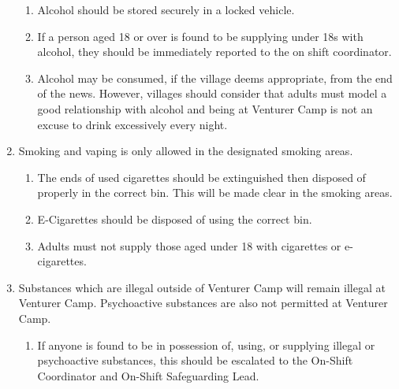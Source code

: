 \documentclass[a4paper, 11pt]{report}
\def\enumMarginIndentOne{4em}
\begin{document}
\begin{enumerate}
\begin{enumerate}[leftmargin=\enumMarginIndentOne]
            \item Alcohol should be stored securely in a locked vehicle.
            \item If a person aged 18 or over is found to be supplying under 18s with alcohol, they should be immediately reported to the on shift coordinator.
            \item Alcohol may be consumed, if the village deems appropriate, from the end of the news. However, villages should consider that adults must model a good relationship with alcohol and being at Venturer Camp is not an excuse to drink excessively every night.
        \end{enumerate}
        \item Smoking and vaping is only allowed in the designated smoking areas.
        \begin{enumerate}[leftmargin=\enumMarginIndentOne]
            \item The ends of used cigarettes should be extinguished then disposed of properly in the correct bin. This will be made clear in the smoking areas.
            \item E-Cigarettes should be disposed of using the correct bin. 
            \item Adults must not supply those aged under 18 with cigarettes or e-cigarettes.
        \end{enumerate}
        \item Substances which are illegal outside of Venturer Camp will remain illegal at Venturer Camp. Psychoactive substances are also not permitted at Venturer Camp.
        \begin{enumerate}[leftmargin=\enumMarginIndentOne]
            \item If anyone is found to be in possession of, using, or supplying illegal or psychoactive substances, this should be escalated to the On-Shift Coordinator and On-Shift Safeguarding Lead. 
        \end{enumerate}
    \end{enumerate}
\end{document}

